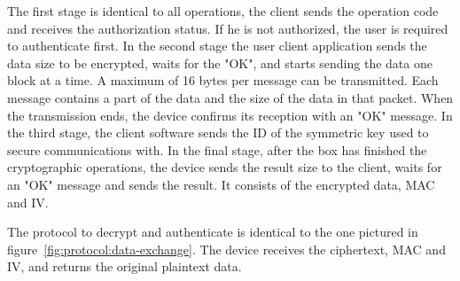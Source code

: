 The first stage is identical to all operations, the client sends the operation code and receives the authorization status. If he is not authorized, the user is required to authenticate first.
In the second stage the user client application sends the data size to be encrypted, waits for the "OK", and starts sending the data one block at a time.
A maximum of 16 bytes per message can be transmitted. Each message contains a part of the data and the size of the data in that packet. When the transmission ends, the device confirms its reception with an "OK" message.
In the third stage, the client software sends the ID of the symmetric key used to secure communications with.
In the final stage, after the box has finished the cryptographic operations, the device sends the result size to the client, waits for an "OK" message and sends the result. It consists of the encrypted data, MAC and IV.

The protocol to decrypt and authenticate is identical to the one pictured in figure~\ref{fig:protocol:data-exchange}. The device receives the ciphertext, \ac{MAC} and \ac{IV}, and returns the original plaintext data.

\hfill
\hfill


%
%
